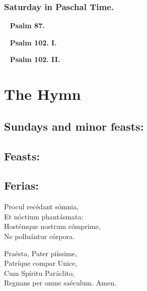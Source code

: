 \documentclass[a5paper,11pt,twoside,openany]{memoir}
\def\startParallel{}
\def\stopParallel{}
\let\oldtextbf\textbf
\newcommand\psalm[1]{~ \hfill \oldtextbf{Psalm #1.} \hfill ~}
\begin{document}
\startParallel

\stopParallel



\subsection{Saturday in Paschal Time.}


\psalm{87}

\psalm{102. I}

\psalm{102. II}






\chapter{The Hymn}

\section{Sundays and minor feasts:}


\section{Feasts:}


\section{Ferias:}


Procul recédant sómnia,\\
Et nóctium phantásmata:\\
Hostémque nostrum cómprime,\\
Ne polluántur córpora.

Praésta, Pater piíssime,\\
Patríque compar Unice,\\
Cum Spíritu Paráclito,\\
Regnans per omne saéculum.  Amen.
\end{document}

